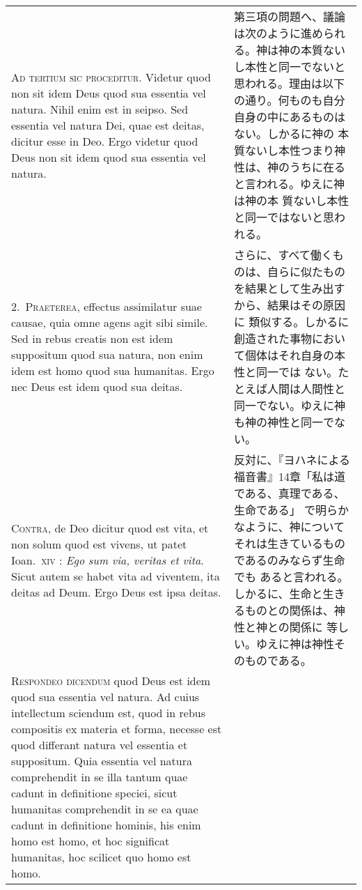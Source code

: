 \documentclass[10pt]{jsarticle} %
\begin{document}
\begin{longtable}{p{21em}p{21em}}


\textsc{Ad tertium sic proceditur}. Videtur quod non sit idem Deus quod sua
 essentia vel natura. Nihil enim est in seipso. Sed essentia vel natura
 Dei, quae est deitas, dicitur esse in Deo. Ergo videtur quod Deus non
 sit idem quod sua essentia vel natura.


&

第三項の問題へ、議論は次のように進められる。神は神の本質ないし本性と同一でないと
 思われる。理由は以下の通り。何ものも自分自身の中にあるものはない。しかるに神の
 本質ないし本性つまり神性は、神のうちに在ると言われる。ゆえに神は神の本
 質ないし本性と同一ではないと思われる。

\\

2.~\textsc{Praeterea}, effectus assimilatur suae causae, quia omne agens
 agit sibi simile. Sed in rebus creatis non est idem suppositum quod sua
 natura, non enim idem est homo quod sua humanitas. Ergo nec Deus est
 idem quod sua deitas.

&

さらに、すべて働くものは、自らに似たものを結果として生み出すから、結果はその原因に
 類似する。しかるに創造された事物において個体はそれ自身の本性と同一では
 ない。たとえば人間は人間性と同一でない。ゆえに神も神の神性と同一でない。

\\


\textsc{Contra}, de Deo dicitur quod est vita, et non solum quod est
 vivens, ut patet Ioan.~\textsc{xiv} : \textit{Ego sum via, veritas et
 vita}. Sicut autem se habet vita ad viventem, ita deitas ad Deum. Ergo
 Deus est ipsa deitas.

&

反対に、『ヨハネによる福音書』14章「私は道である、真理である、生命である」
 で明らかなように、神についてそれは生きているものであるのみならず生命でも
 あると言われる。しかるに、生命と生きるものとの関係は、神性と神との関係に
 等しい。ゆえに神は神性そのものである。

\\



\textsc{Respondeo dicendum} quod Deus est idem quod sua essentia vel natura.
Ad cuius intellectum sciendum est, quod in rebus compositis ex materia et forma, necesse est quod differant natura vel essentia et suppositum.
Quia essentia vel natura comprehendit in se illa tantum quae cadunt in
 definitione speciei, sicut humanitas comprehendit in se ea quae cadunt
 in definitione hominis, his enim homo est homo, et hoc significat
 humanitas, hoc scilicet quo homo est homo.


\end{longtable}
\end{document}
